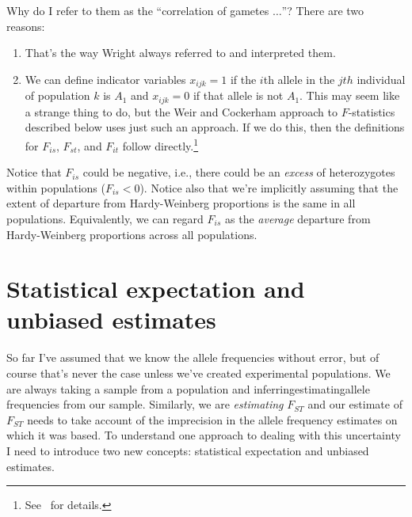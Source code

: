 \documentclass[12pt]{article}
\begin{document}
Why do I refer to them as the ``correlation of gametes $\dots$''?
There are two reasons:

\begin{enumerate}

\item That's the way Wright always referred to and interpreted them.

\item We can define indicator variables $x_{ijk} = 1$ if the $i$th
  allele in the $jth$ individual of population $k$ is $A_1$ and
  $x_{ijk} = 0$ if that allele is not $A_1$. This may seem like a
  strange thing to do, but the Weir and Cockerham approach to
  $F$-statistics described below uses just such an approach. If we do
  this, then the definitions for $F_{is}$, $F_{st}$, and $F_{it}$
  follow directly.\footnote{See~\cite{Weir-1996} for details.}

\end{enumerate}

Notice that $F_{is}$ could be negative, i.e., there could be an {\it
  excess\/} of heterozygotes within populations ($F_{is} < 0$). Notice
also that we're implicitly assuming that the extent of departure from
Hardy-Weinberg proportions is the same in all
populations. Equivalently, we can regard $F_{is}$ as the {\it
  average\/} departure from Hardy-Weinberg proportions across all
populations.

\section*{Statistical expectation and unbiased
  estimates}

So far I've assumed that we know the allele frequencies without error,
but of course that's never the case unless we've created experimental
populations. We are always taking a sample from a population and
inferring{\dash}estimating{\dash}allele frequencies from our
sample. Similarly, we are {\it estimating\/} $F_{ST}$ and our estimate
of $F_{ST}$ needs to take account of the imprecision in the allele
frequency estimates on which it was based. To understand one approach
to dealing with this uncertainty I need to introduce two new concepts:
statistical expectation and unbiased
estimates.
\end{document}

